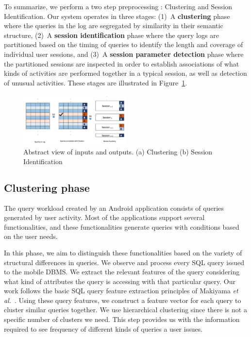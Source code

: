 To summarize, we perform a two step preprocessing : Clustering and Session Identification. Our system operates in three stages: (1)~A \textbf{clustering} phase where the queries in the log are segregated by similarity in their semantic structure, (2)~A \textbf{session identification} phase where the query logs are partitioned based on the timing of queries to identify the length and coverage of individual user sessions, and (3)~A \textbf{session parameter detection} phase where the partitioned sessions are inspected in order to establish associations of what kinds of activities are performed together in a typical session, as well as detection of unusual activities. These stages are illustrated in Figure~\ref{fig:abstractview}. 

\begin{figure}[h!]
    \centering
    \includegraphics[width=0.5\textwidth]{graphics/systemoutline}
    \caption{Abstract view of inputs and outputs. (a) Clustering (b) Session Identification}
    \label{fig:abstractview}
\end{figure}


\subsection{Clustering phase}

The query workload created by an Android application consists of queries generated by user activity.
Most of the applications support several functionalities, and these functionalities generate queries with conditions based on the user needs.

In this phase, we aim to distinguish these functionalities based on the variety of structural differences in queries.
We observe and process every SQL query issued to the mobile DBMS.
We extract the relevant features of the query considering what kind of attributes the query is accessing with that particular query.
Our work follows the basic SQL query feature extraction principles of Makiyama \textit{et al.}~\cite{makiyama2015text}.
Using these query features, we construct a feature vector for each query to cluster similar queries together.
We use hierarchical clustering since there is not a specific number of clusters we need. 
This step provides us with the information required to see frequency of different kinds of queries a user issues.

